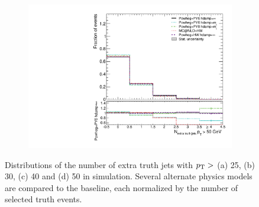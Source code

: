 \begin{figure}
\begin{subfigure}[]{0.45\textwidth}
\end{subfigure}
\begin{subfigure}[]{0.45\textwidth}
\includegraphics[width=\textwidth]{fig/MCComp/NLO/NTruthExtraJets50.pdf}
\end{subfigure}
\caption{Distributions of the number of extra truth jets with $p_{\text{T}} >$ (a) 25, (b) 30, (c) 40 and (d) 50 \GeV in \ttbar simulation. Several alternate physics models are compared to the baseline, each normalized by the number of selected truth events.}
\label{fig:ntruthjets}
\end{figure}
